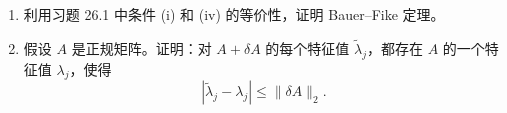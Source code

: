 \documentclass[UTF8,fontset=none,12pt]{ctexart}
\begin{document}
\begin{enumerate}[label=(\alph*)]
  \item 利用习题 26.1 中条件 (i) 和 (iv) 的等价性，证明 Bauer--Fike
  定理。
  \item 假设 $A$ 是正规矩阵。证明：对 $A+\delta A$ 的每个特征值
  $\widetilde\lambda_j$，都存在 $A$ 的一个特征值 $\lambda_j$，使得
                   \begin{equation}
   |\widetilde\lambda_j-\lambda_j|\le\|\delta A\|_2.
   \tag{26.4}
  \end{equation}
\end{enumerate}
\end{document}
